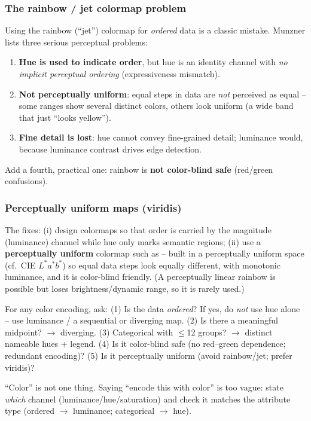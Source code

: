\subsubsection{The rainbow / jet colormap problem}
Using the rainbow (``jet'') colormap for \emph{ordered} data is a classic
mistake. Munzner lists three serious perceptual problems:

\begin{pitfall}
\begin{enumerate}
  \item \textbf{Hue is used to indicate order}, but hue is an identity channel
    with \emph{no implicit perceptual ordering} (expressiveness mismatch).
  \item \textbf{Not perceptually uniform}: equal steps in data are \emph{not}
    perceived as equal -- some ranges show several distinct colors, others
    look uniform (a wide band that just ``looks yellow'').
  \item \textbf{Fine detail is lost}: hue cannot convey fine-grained detail;
    luminance would, because luminance contrast drives edge detection.
\end{enumerate}
Add a fourth, practical one: rainbow is \textbf{not color-blind safe}
(red/green confusions).
\end{pitfall}

\subsubsection{Perceptually uniform maps (viridis)}
The fixes: (i) design  colormaps so
that order is carried by the magnitude (luminance) channel while hue only marks
semantic regions; (ii) use a \textbf{perceptually uniform} colormap such as
 -- built in a perceptually uniform space (cf.\ CIE
$L^*a^*b^*$) so equal data steps look equally different, with monotonic
luminance, and it is color-blind friendly. (A perceptually linear rainbow is
possible but loses brightness/dynamic range, so it is rarely used.)

\begin{exambox}
For any color encoding, ask:
(1) Is the data \emph{ordered}? If yes, do \emph{not} use hue alone -- use
luminance / a sequential or diverging map.
(2) Is there a meaningful midpoint? $\to$ diverging.
(3) Categorical with $\le$12 groups? $\to$ distinct nameable hues + legend.
(4) Is it color-blind safe (no red--green dependence; redundant encoding)?
(5) Is it perceptually uniform (avoid rainbow/jet; prefer viridis)?
\end{exambox}

\begin{pitfall}
``Color'' is not one thing. Saying ``encode this with color'' is too vague:
state \emph{which} channel (luminance/hue/saturation) and check it matches the
attribute type (ordered $\to$ luminance; categorical $\to$ hue).
\end{pitfall}
